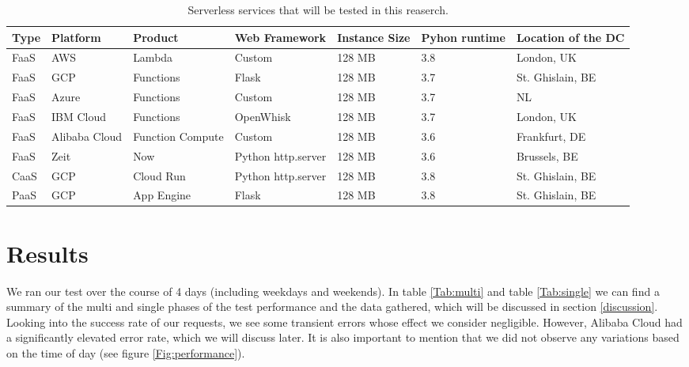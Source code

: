 \documentclass[11pt]{article}
\begin{document}
\begin{table}
\begin{adjustwidth}{-0.9cm}{}
 \begin{tabularx}{1.1\textwidth}{p{1cm} X X X X X p{3cm}}
 \textbf{Type} & \textbf{Platform} & \textbf{Product} & \textbf{Web Framework} & \textbf{Instance Size} & \textbf{Pyhon runtime} & \textbf{Location of the DC} \\
 \hline
 \hline
 FaaS & AWS & Lambda & Custom & 128 MB & 3.8 & London, UK \\
 \hline
 FaaS & GCP & Functions & Flask & 128 MB & 3.7 & St. Ghislain, BE \\
 \hline
 FaaS & Azure & Functions & Custom & 128 MB & 3.7 & NL \\
 \hline
 FaaS & IBM Cloud & Functions & OpenWhisk & 128 MB & 3.7 & London, UK\\
 \hline
 FaaS & Alibaba Cloud & Function Compute & Custom & 128 MB & 3.6 & Frankfurt, DE\\
 \hline
 FaaS & Zeit & Now & Python http.server  & 128 MB & 3.6 & Brussels, BE\\
 \hline
 CaaS & GCP & Cloud Run & Python http.server & 128 MB & 3.8 & St. Ghislain, BE\\
 \hline
 PaaS & GCP & App Engine & Flask & 128 MB & 3.8 & St. Ghislain, BE\\
 \hline

\end{tabularx}
\caption{Serverless services that will be tested in this reaserch.}
\label{Tab:services}
\end{adjustwidth}
\end{table}




\section{Results}

We ran our test over the course of 4 days (including weekdays and weekends). In table \ref{Tab:multi} and table \ref{Tab:single} we can find a summary of the multi and single phases of the test performance and the data gathered, which will be discussed in section \ref{discussion}. \\

Looking into the success rate of our requests, we see some transient errors whose effect we consider negligible. However, Alibaba Cloud had a significantly elevated error rate, which we will discuss later. It is also important to mention that we did not observe any variations based on the time of day (see figure \ref{Fig:performance}).
\end{document}
